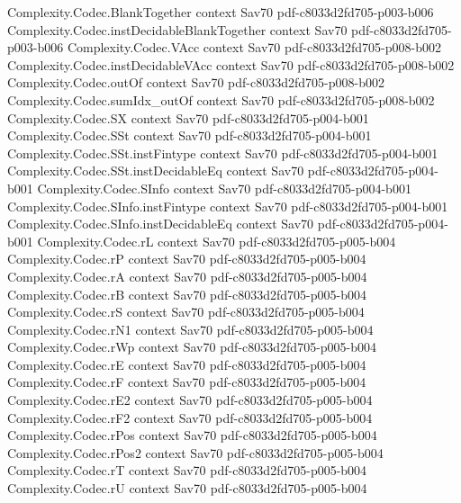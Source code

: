 \begin{theorem}
\proofstep
  {Complexity.Codec.BlankTogether}
  {context}
  {Sav70}
  {pdf-c8033d2fd705-p003-b006}
\proofstep
  {Complexity.Codec.instDecidableBlankTogether}
  {context}
  {Sav70}
  {pdf-c8033d2fd705-p003-b006}
\proofstep
  {Complexity.Codec.VAcc}
  {context}
  {Sav70}
  {pdf-c8033d2fd705-p008-b002}
\proofstep
  {Complexity.Codec.instDecidableVAcc}
  {context}
  {Sav70}
  {pdf-c8033d2fd705-p008-b002}
\proofstep
  {Complexity.Codec.outOf}
  {context}
  {Sav70}
  {pdf-c8033d2fd705-p008-b002}
\proofstep
  {Complexity.Codec.sumIdx_outOf}
  {context}
  {Sav70}
  {pdf-c8033d2fd705-p008-b002}
\proofstep
  {Complexity.Codec.SX}
  {context}
  {Sav70}
  {pdf-c8033d2fd705-p004-b001}
\proofstep
  {Complexity.Codec.SSt}
  {context}
  {Sav70}
  {pdf-c8033d2fd705-p004-b001}
\proofstep
  {Complexity.Codec.SSt.instFintype}
  {context}
  {Sav70}
  {pdf-c8033d2fd705-p004-b001}
\proofstep
  {Complexity.Codec.SSt.instDecidableEq}
  {context}
  {Sav70}
  {pdf-c8033d2fd705-p004-b001}
\proofstep
  {Complexity.Codec.SInfo}
  {context}
  {Sav70}
  {pdf-c8033d2fd705-p004-b001}
\proofstep
  {Complexity.Codec.SInfo.instFintype}
  {context}
  {Sav70}
  {pdf-c8033d2fd705-p004-b001}
\proofstep
  {Complexity.Codec.SInfo.instDecidableEq}
  {context}
  {Sav70}
  {pdf-c8033d2fd705-p004-b001}
\proofstep
  {Complexity.Codec.rL}
  {context}
  {Sav70}
  {pdf-c8033d2fd705-p005-b004}
\proofstep
  {Complexity.Codec.rP}
  {context}
  {Sav70}
  {pdf-c8033d2fd705-p005-b004}
\proofstep
  {Complexity.Codec.rA}
  {context}
  {Sav70}
  {pdf-c8033d2fd705-p005-b004}
\proofstep
  {Complexity.Codec.rB}
  {context}
  {Sav70}
  {pdf-c8033d2fd705-p005-b004}
\proofstep
  {Complexity.Codec.rS}
  {context}
  {Sav70}
  {pdf-c8033d2fd705-p005-b004}
\proofstep
  {Complexity.Codec.rN1}
  {context}
  {Sav70}
  {pdf-c8033d2fd705-p005-b004}
\proofstep
  {Complexity.Codec.rWp}
  {context}
  {Sav70}
  {pdf-c8033d2fd705-p005-b004}
\proofstep
  {Complexity.Codec.rE}
  {context}
  {Sav70}
  {pdf-c8033d2fd705-p005-b004}
\proofstep
  {Complexity.Codec.rF}
  {context}
  {Sav70}
  {pdf-c8033d2fd705-p005-b004}
\proofstep
  {Complexity.Codec.rE2}
  {context}
  {Sav70}
  {pdf-c8033d2fd705-p005-b004}
\proofstep
  {Complexity.Codec.rF2}
  {context}
  {Sav70}
  {pdf-c8033d2fd705-p005-b004}
\proofstep
  {Complexity.Codec.rPos}
  {context}
  {Sav70}
  {pdf-c8033d2fd705-p005-b004}
\proofstep
  {Complexity.Codec.rPos2}
  {context}
  {Sav70}
  {pdf-c8033d2fd705-p005-b004}
\proofstep
  {Complexity.Codec.rT}
  {context}
  {Sav70}
  {pdf-c8033d2fd705-p005-b004}
\proofstep
  {Complexity.Codec.rU}
  {context}
  {Sav70}
  {pdf-c8033d2fd705-p005-b004}

\end{theorem}
